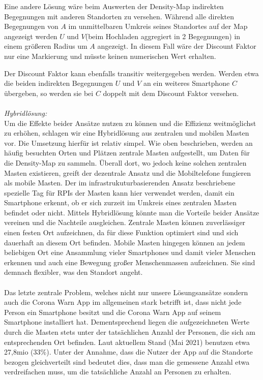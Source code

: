 \documentclass[conference,compsoc]{IEEEtran}
\begin{document}
Eine andere Lösung wäre beim Auswerten der Density-Map indirekten Begegnungen mit anderen Standorten zu versehen. 
Während alle direkten Begegnungen von $A$ im unmittelbaren Umkreis seines Standortes auf der Map angezeigt werden $U$ und $V$(beim Hochladen aggregiert in 2 Begegnungen) in einem größeren Radius um $A$ angezeigt.
In diesem Fall wäre der Discount Faktor nur eine Markierung und müsste keinen numerischen Wert erhalten. 

Der Discount Faktor kann ebenfalls transitiv weitergegeben werden. 
Werden etwa die beiden indirekten Begegnungen $U$ und $V$ an ein weiteres Smartphone $C$ übergeben, so werden sie bei $C$ doppelt mit dem Discount Faktor versehen.\\
\\
\textit{Hybridlösung:}\\
Um die Effekte beider Ansätze nutzen zu können und die Effizienz weitmöglichst zu erhöhen, schlagen wir eine Hybridlösung aus zentralen und mobilen Masten vor. 
Die Umsetzung hierfür ist relativ simpel. Wie oben beschrieben, werden an häufig besuchten Orten und Plätzen zentrale Masten aufgestellt, um Daten für die Density-Map zu sammeln. 
Überall dort, wo jedoch keine solchen zentralen Masten existieren, greift der dezentrale Ansatz und die Mobiltelefone fungieren als mobile Masten. 
Der im infrastrukuturbasierenden Ansatz beschriebene spezielle Tag für RPIs der Masten kann hier verwendet werden, damit ein Smartphone erkennt, ob er sich zurzeit im Umkreis eines zentralen Masten befindet oder nicht. 
Mittels Hybridlösung könnte man die Vorteile beider Ansätze vereinen und die Nachteile ausgleichen. Zentrale Masten können zuverlässiger einen festen Ort aufzeichnen, da für diese Funktion optimiert sind und sich dauerhaft an diesem Ort befinden.
Mobile Masten hingegen können an jedem beliebigen Ort eine Ansammlung vieler Smartphones und damit vieler Menschen erkennen und auch eine Bewegung großer Menschenmassen aufzeichnen.
Sie sind demnach flexibler, was den Standort angeht.\\
\\
Das letzte zentrale Problem, welches nicht nur unsere Lösungsansätze sondern auch die Corona Warn App im allgemeinen stark betrifft ist, dass nicht jede Person ein Smartphone besitzt und die  Corona Warn App auf seinem Smartphone installiert hat. 
Dementsprechend liegen die aufgezeichneten Werte durch die Masten stets unter der tatsächlichen Anzahl der Personen, die sich am entsprechenden Ort befinden. Laut aktuellem Stand (Mai 2021) benutzen etwa 27,8mio (33\%). \cite{Downloads}
Unter der Annahme, dass die Nutzer der App auf die Standorte bezogen gleichverteilt sind bedeutet dies, dass man die gemessene Anzahl etwa verdreifachen muss, um die tatsächliche Anzahl an Personen zu erhalten.\\
\end{document}
